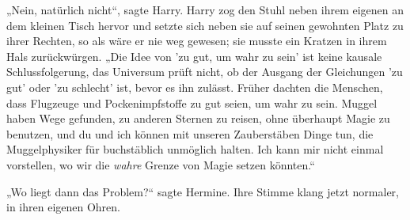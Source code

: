 „Nein, natürlich nicht“, sagte Harry. Harry zog den Stuhl neben ihrem eigenen an dem kleinen Tisch hervor und setzte sich neben sie auf seinen gewohnten Platz zu ihrer Rechten, so als wäre er nie weg gewesen; sie musste ein Kratzen in ihrem Hals zurückwürgen. „Die Idee von 'zu gut, um wahr zu sein' ist keine kausale Schlussfolgerung, das Universum prüft nicht, ob der Ausgang der Gleichungen 'zu gut' oder 'zu schlecht' ist, bevor es ihn zulässt. Früher dachten die Menschen, dass Flugzeuge und Pockenimpfstoffe zu gut seien, um wahr zu sein. Muggel haben Wege gefunden, zu anderen Sternen zu reisen, ohne überhaupt Magie zu benutzen, und du und ich können mit unseren Zauberstäben Dinge tun, die Muggelphysiker für buchstäblich unmöglich halten. Ich kann mir nicht einmal vorstellen, wo wir die \emph{wahre} Grenze von Magie setzen könnten.“

„Wo liegt dann das Problem?“ sagte Hermine. Ihre Stimme klang jetzt normaler, in ihren eigenen Ohren.


